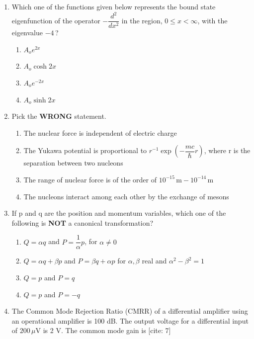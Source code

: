 \documentclass[14pt, a4paper]{extarticle}
\begin{document}
\begin{enumerate}[label=\textbf{Q. \arabic*}]
\item Which one of the functions given below represents the bound state eigenfunction of the operator $-\dfrac{d^2}{dx^2}$ in the region, $0 \le x < \infty$, with the eigenvalue $-4$\,?
    \begin{multicols}{2}
    \begin{enumerate}[label=(\Alph*)]
        \item $A_o e^{2x}$
        \item $A_o \cosh 2x$
        \item $A_o e^{-2x}$
        \item $A_o \sinh 2x$
    \end{enumerate}
    \end{multicols}

\item Pick the \textbf{WRONG} statement.
    \begin{enumerate}[label=(\Alph*)]
        \item The nuclear force is independent of electric charge
        \item The Yukawa potential is proportional to $r^{-1} \exp\left(-\dfrac{mc}{\hbar} r\right)$, where r is the separation between two nucleons
        \item The range of nuclear force is of the order of $10^{-15}\,\mathrm{m} - 10^{-14}\,\mathrm{m}$
        \item The nucleons interact among each other by the exchange of mesons
    \end{enumerate}

\item If p and q are the position and momentum variables, which one of the following is \textbf{NOT} a canonical transformation?
    \begin{enumerate}[label=(\Alph*)]
        \item $Q = \alpha q$ and $P = \dfrac{1}{\alpha}p$, for $\alpha \neq 0$
        \item $Q = \alpha q + \beta p$ and $P = \beta q + \alpha p$ for $\alpha, \beta$ real and $\alpha^2 - \beta^2 = 1$
        \item $Q = p$ and $P = q$
        \item $Q = p$ and $P = -q$
    \end{enumerate}

\item The Common Mode Rejection Ratio (CMRR) of a differential amplifier using an operational amplifier is 100 dB. The output voltage for a differential input of $200\,\mu\text{V}$ is 2 V. The common mode gain is [cite: 7]
    \begin{enumerate}[label=(\Alph*)]
    \end{enumerate}


\end{enumerate}
\end{document}
